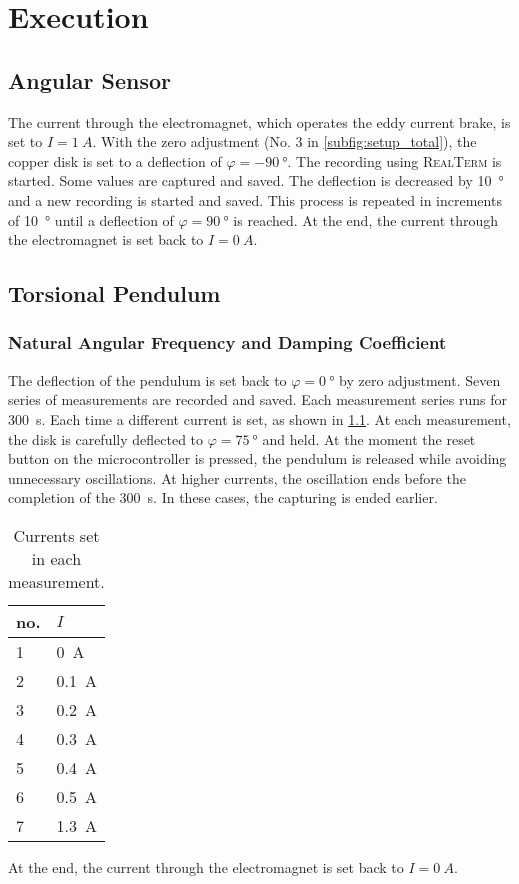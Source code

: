 \chapter{Execution}
    \section{Angular Sensor}
        The current through the electromagnet, which operates the eddy current brake, is set to \(I = \SI{1}{A}\). With the
        zero adjustment (No. 3 in \cref{subfig:setup_total}), the copper disk is set to a deflection of \(\varphi = \SI{-90}{\degree}\).
        The recording using \textsc{RealTerm} is started. Some values are captured and saved. The deflection is decreased by \SI{10}{\degree}
        and a new recording is started and saved. This process is repeated in increments of \SI{10}{\degree} until a deflection of
        \(\varphi = \SI{+90}{\degree}\) is reached. At the end, the current through the electromagnet is set back to \(I = \SI{0}{A}\).
%
    \section{Torsional Pendulum}
        \subsection{Natural Angular Frequency and Damping Coefficient}
            The deflection of the pendulum is set back to \(\varphi = \SI{0}{\degree}\) by zero adjustment. Seven series of measurements
            are recorded and saved. Each measurement series runs for \SI{300}{s}. Each time a different current is set, as shown
            in \cref{tab:currents}. At each measurement, the disk is carefully deflected to \(\varphi = \SI{75}{\degree}\) and
            held. At the moment the reset button on the microcontroller is pressed, the pendulum is released while avoiding
            unnecessary oscillations. At higher currents, the oscillation ends before the completion of the \SI{300}{s}. In these cases, the
            capturing is ended earlier.
        \begin{table}[H]
            \centering
            \caption[Currents set]{Currents set in each measurement.}
            \label{tab:currents}
            \begin{tabular}{@{}ll@{}}
                \toprule
                no.     & $I$\\
                \midrule
                1       & \SI{0}{A}\\
                2       & \SI{0.1}{A}\\
                3       & \SI{0.2}{A}\\
                4       & \SI{0.3}{A}\\
                5       & \SI{0.4}{A}\\
                6       & \SI{0.5}{A}\\
                7       & \SI{1.3}{A}\\
                \bottomrule
            \end{tabular}
        \end{table}
        At the end, the current through the electromagnet is set back to \(I = \SI{0}{A}\).

